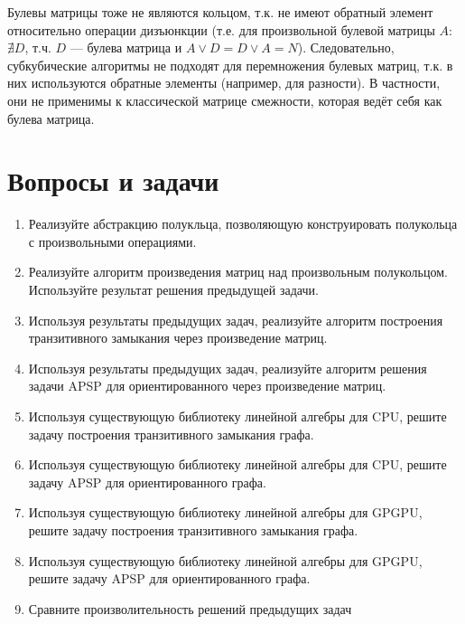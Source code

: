 Булевы матрицы тоже не являются кольцом, т.к. не имеют обратный элемент относительно операции дизъюнкции (т.е. для произвольной булевой матрицы $A$: $\nexists D$, т.ч. $D$ --- булева матрица и $A \vee D = D \vee A = N$). Следовательно, субкубические алгоритмы не подходят для перемножения булевых матриц, т.к. в них используются обратные элементы (например, для разности). В частности, они не применимы к классической матрице смежности, которая ведёт себя как булева матрица.

\section{Вопросы и задачи}
\begin{enumerate}
  \item Реализуйте абстракцию полукльца, позволяющую конструировать полукольца с произвольными операциями.
  \item Реализуйте алгоритм произведения матриц над произвольным полукольцом. Используйте результат решения предыдущей задачи.
  \item Используя результаты предыдущих задач, реализуйте алгоритм построения транзитивного замыкания через произведение матриц.
  \item Используя результаты предыдущих задач, реализуйте алгоритм решения задачи APSP для ориентированного через произведение матриц.
  \item Используя существующую библиотеку линейной алгебры для CPU, решите задачу построения транзитивного замыкания графа. 
  \item Используя существующую библиотеку линейной алгебры для CPU, решите задачу APSP для ориентированного графа.
  \item Используя существующую библиотеку линейной алгебры для GPGPU, решите задачу построения транзитивного замыкания графа. 
  \item Используя существующую библиотеку линейной алгебры для GPGPU, решите задачу APSP для ориентированного графа.
  \item Сравните произволительность решений предыдущих задач
\end{enumerate}
